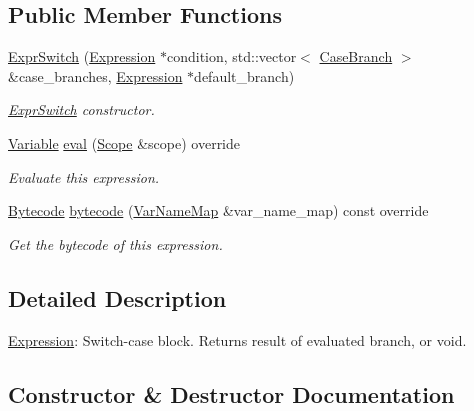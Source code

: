 \subsection*{Public Member Functions}
\begin{DoxyCompactItemize}
\item 
\hyperlink{classcreek_1_1_expr_switch_ab99b8e34563c4371bfdd5c79052ec859}{Expr\+Switch} (\hyperlink{classcreek_1_1_expression}{Expression} $\ast$condition, std\+::vector$<$ \hyperlink{structcreek_1_1_expr_switch_1_1_case_branch}{Case\+Branch} $>$ \&case\+\_\+branches, \hyperlink{classcreek_1_1_expression}{Expression} $\ast$default\+\_\+branch)
\begin{DoxyCompactList}\small\item\em {\ttfamily \hyperlink{classcreek_1_1_expr_switch}{Expr\+Switch}} constructor. \end{DoxyCompactList}\item 
\hyperlink{classcreek_1_1_variable}{Variable} \hyperlink{classcreek_1_1_expr_switch_a80d7830447263afc5a1acd27e770d47b}{eval} (\hyperlink{classcreek_1_1_scope}{Scope} \&scope) override
\begin{DoxyCompactList}\small\item\em Evaluate this expression. \end{DoxyCompactList}\item 
\hyperlink{classcreek_1_1_bytecode}{Bytecode} \hyperlink{classcreek_1_1_expr_switch_a2fe712f4e8d7a831186d5ce61ae27d00}{bytecode} (\hyperlink{classcreek_1_1_var_name_map}{Var\+Name\+Map} \&var\+\_\+name\+\_\+map) const  override\hypertarget{classcreek_1_1_expr_switch_a2fe712f4e8d7a831186d5ce61ae27d00}{}\label{classcreek_1_1_expr_switch_a2fe712f4e8d7a831186d5ce61ae27d00}

\begin{DoxyCompactList}\small\item\em Get the bytecode of this expression. \end{DoxyCompactList}\end{DoxyCompactItemize}


\subsection{Detailed Description}
\hyperlink{classcreek_1_1_expression}{Expression}\+: Switch-\/case block. Returns result of evaluated branch, or void. 

\subsection{Constructor \& Destructor Documentation}
